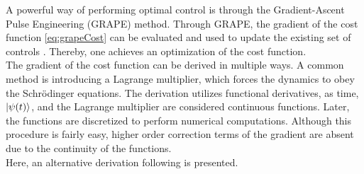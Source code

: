 A powerful way of performing optimal control is through the Gradient-Ascent Pulse Engineering (GRAPE) method. Through GRAPE, the gradient of the cost function \eqref{eq:grapeCost} can be evaluated and used to update the existing set of controls \cite{Khaneja2005}. Thereby, one achieves an optimization of the cost function.\\
The gradient of the cost function can be derived in multiple ways. A common method \cite{Hohenester2007, Winckel2008, BECcontrol} is introducing a Lagrange multiplier, which forces the dynamics to obey the Schrödinger equations. The derivation utilizes functional derivatives, as time, $\ket{\psi (t)}$, and the Lagrange multiplier are considered continuous functions. Later, the functions are discretized to perform numerical computations. Although this procedure is fairly easy, higher order correction terms of the gradient are absent due to the continuity of the functions.\\
Here, an alternative derivation following \cite{Khaneja2005, deFouquieres2011} is presented.

